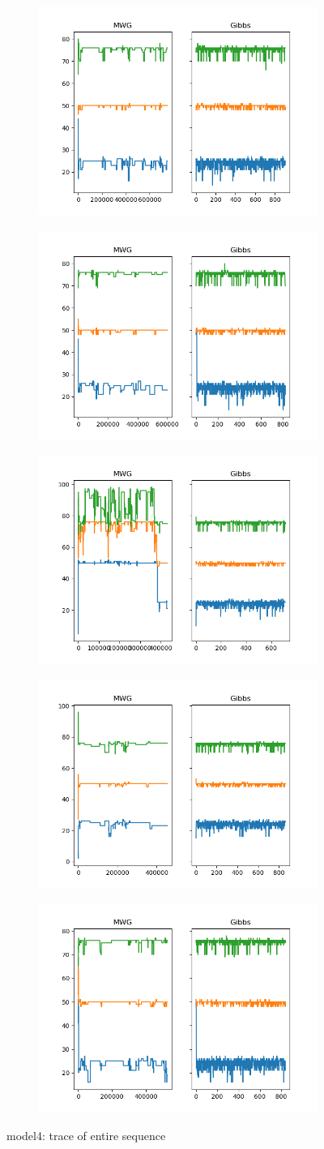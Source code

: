 \begin{figure}[h]
    \centering
    \begin{subfigure}
    	\centering
        \includegraphics[width=0.3\linewidth]{../../plots/Trace_M4_N100_NMCMC3_seed0_diffind2.png}
    \end{subfigure}
    \begin{subfigure}
        \centering
    	\includegraphics[width=0.3\linewidth]{../../plots/Trace_M4_N100_NMCMC3_seed1_diffind2.png}
	\end{subfigure}
	\begin{subfigure}
	    \centering
    	\includegraphics[width=0.3\linewidth]{../../plots/Trace_M4_N100_NMCMC3_seed2_diffind2.png}
	\end{subfigure}
	\begin{subfigure}
	    \centering
    	\includegraphics[width=0.3\linewidth]{../../plots/Trace_M4_N100_NMCMC3_seed3_diffind2.png}
	\end{subfigure}
	\begin{subfigure}
	    \centering
    	\includegraphics[width=0.3\linewidth]{../../plots/Trace_M4_N100_NMCMC3_seed4_diffind2.png}
	\end{subfigure}
	\caption{model4: trace of entire sequence}
\end{figure}

